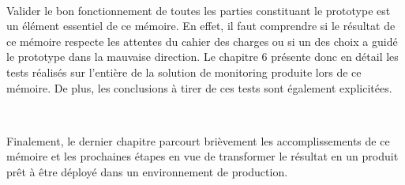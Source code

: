 ~

\noindent
Valider le bon fonctionnement de toutes les parties constituant le prototype est un élément essentiel de ce mémoire. En effet, il faut comprendre si le résultat de ce mémoire respecte les attentes du cahier des charges ou si un des choix a guidé le prototype dans la mauvaise direction. Le chapitre 6 présente donc en détail les tests réalisés sur l’entière de la solution de monitoring produite lors de ce mémoire. De plus, les conclusions à tirer de ces tests sont également explicitées.

~

\noindent
Finalement, le dernier chapitre parcourt brièvement les accomplissements de ce mémoire et les prochaines étapes en vue de transformer le résultat en un produit prêt à être déployé dans un environnement de production.
